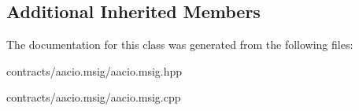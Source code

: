 \subsection*{Additional Inherited Members}


The documentation for this class was generated from the following files\+:\begin{DoxyCompactItemize}
\item 
contracts/aacio.\+msig/aacio.\+msig.\+hpp\item 
contracts/aacio.\+msig/aacio.\+msig.\+cpp\end{DoxyCompactItemize}
